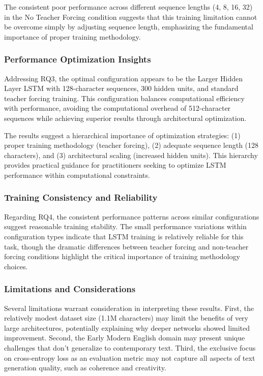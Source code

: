 \documentclass[12pt]{article}
\begin{document}
The consistent poor performance across different sequence lengths (4, 8, 16, 32) in the No Teacher Forcing condition suggests that this training limitation cannot be overcome simply by adjusting sequence length, emphasizing the fundamental importance of proper training methodology.

\subsubsection{Performance Optimization Insights}

Addressing RQ3, the optimal configuration appears to be the Larger Hidden Layer LSTM with 128-character sequences, 300 hidden units, and standard teacher forcing training. This configuration balances computational efficiency with performance, avoiding the computational overhead of 512-character sequences while achieving superior results through architectural optimization.

The results suggest a hierarchical importance of optimization strategies: (1) proper training methodology (teacher forcing), (2) adequate sequence length (128 characters), and (3) architectural scaling (increased hidden units). This hierarchy provides practical guidance for practitioners seeking to optimize LSTM performance within computational constraints.

\subsubsection{Training Consistency and Reliability}

Regarding RQ4, the consistent performance patterns across similar configurations suggest reasonable training stability. The small performance variations within configuration types indicate that LSTM training is relatively reliable for this task, though the dramatic differences between teacher forcing and non-teacher forcing conditions highlight the critical importance of training methodology choices.

\subsubsection{Limitations and Considerations}

Several limitations warrant consideration in interpreting these results. First, the relatively modest dataset size (1.1M characters) may limit the benefits of very large architectures, potentially explaining why deeper networks showed limited improvement. Second, the Early Modern English domain may present unique challenges that don't generalize to contemporary text. Third, the exclusive focus on cross-entropy loss as an evaluation metric may not capture all aspects of text generation quality, such as coherence and creativity.
\end{document}
